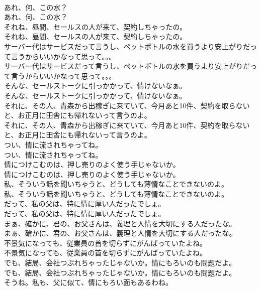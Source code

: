 \documentclass[8pt]{extreport}
\begin{document}
\begin{CJK}{UTF8}{min}
\\	あれ、何、この水？	
\\	あれ、何、この水？ 
\\	それね、昼間、セールスの人が来て、契約しちゃったの。	
\\	それね、昼間、セールスの人が来て、契約しちゃったの。 
\\	サーバー代はサービスだって言うし、ペットボトルの水を買うより安上がりだって言うからいいかなって思って。。。	
\\	サーバー代はサービスだって言うし、ペットボトルの水を買うより安上がりだって言うからいいかなって思って。。。 
\\	そんな、セールストークに引っかかって、情けないなぁ。	
\\	そんな、セールストークに引っかかって、情けないなぁ。 
\\	それに、その人、青森から出稼ぎに来ていて、今月あと10件、契約を取らないと、お正月に田舎にも帰れないって言うのよ。	
\\	それに、その人、青森から出稼ぎに来ていて、今月あと10件、契約を取らないと、お正月に田舎にも帰れないって言うのよ。 
\\	つい、情に流されちゃってね。	
\\	つい、情に流されちゃってね。 
\\	情につけこむのは、押し売りのよく使う手じゃないか。	
\\	情につけこむのは、押し売りのよく使う手じゃないか。 
\\	私、そういう話を聞いちゃうと、どうしても薄情なことできないのよ。	
\\	私、そういう話を聞いちゃうと、どうしても薄情なことできないのよ。 
\\	だって、私の父は、特に情に厚い人だったでしょ。	
\\	だって、私の父は、特に情に厚い人だったでしょ。 
\\	まぁ、確かに、君の、お父さんは、義理と人情を大切にする人だったな。	
\\	まぁ、確かに、君の、お父さんは、義理と人情を大切にする人だったな。 
\\	不景気になっても、従業員の首を切らずにがんばっていたよね。	
\\	不景気になっても、従業員の首を切らずにがんばっていたよね。 
\\	でも、結局、会社つぶれちゃったじゃないか。情にもろいのも問題だよ。	
\\	でも、結局、会社つぶれちゃったじゃないか。情にもろいのも問題だよ。 
\\	そうね。私も、父に似て、情にもろい面もあるわね。	

\end{CJK}
\end{document}
